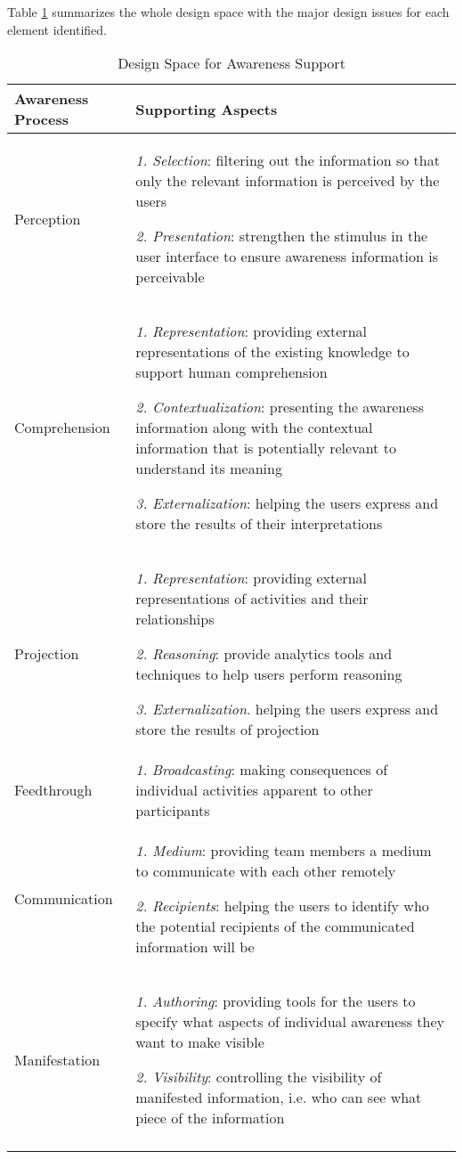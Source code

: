 Table \ref{tab:design_space} summarizes the whole design space with the major design issues for each element identified.

{\footnotesize
	\begin{longtable}{>{\raggedright}m{1.2in}>{\raggedright}p{4.3in}}
\toprule 
\textbf{Awareness Process} & \textbf{Supporting Aspects}\tabularnewline
\midrule 
Perception & \emph{1. Selection}: filtering out the information so that only the
relevant information is perceived by the users

\emph{2. Presentation}: strengthen the stimulus in the user interface
to ensure awareness information is perceivable\tabularnewline
\midrule 
Comprehension & \emph{1. Representation}: providing external representations of the
existing knowledge to support human comprehension

\emph{2. Contextualization}: presenting the awareness information
along with the contextual information that is potentially relevant
to understand its meaning

\emph{3. Externalization}: helping the users express and store the
results of their interpretations\tabularnewline
\midrule 
Projection & \emph{1. Representation}: providing external representations of activities
and their relationships 

\emph{2. Reasoning}: provide analytics tools and techniques to help
users perform reasoning

\emph{3. Externalization}. helping the users express and store the
results of projection\tabularnewline
\midrule 
Feedthrough & \emph{1. }\textit{Broadcasting}: making consequences of individual
activities apparent to other participants\tabularnewline
\midrule 
Communication & \textit{1. Medium}: providing team members a medium to communicate
with each other remotely

\textit{2. Recipients}: helping the users to identify who the potential
recipients of the communicated information will be \tabularnewline
\midrule 
Manifestation & \textit{1. Authoring}: providing tools for the users to specify what
aspects of individual awareness they want to make visible

\textit{2. Visibility}: controlling the visibility of manifested information,
i.e. who can see what piece of the information\tabularnewline
\bottomrule

\caption{Design Space for Awareness Support}
\label{tab:design_space}

\end{longtable}	
}

